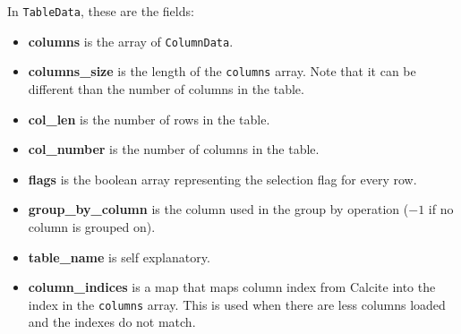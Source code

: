 \documentclass[a4paper, 10pt]{article}
\begin{document}
In \texttt{TableData}, these are the fields:
\begin{itemize}
    \item \textbf{columns} is the array of \texttt{ColumnData}.
    \item \textbf{columns\_size} is the length of the \texttt{columns} array. Note that it can be different than the number of columns in the table.
    \item \textbf{col\_len} is the number of rows in the table.
    \item \textbf{col\_number} is the number of columns in the table.
    \item \textbf{flags} is the boolean array representing the selection flag for every row.
    \item \textbf{group\_by\_column} is the column used in the group by operation ($-1$ if no column is grouped on).
    \item \textbf{table\_name} is self explanatory.
    \item \textbf{column\_indices} is a map that maps column index from Calcite into the index in the \texttt{columns} array. This is used when there are less columns loaded and the indexes do not match.
\end{itemize}
\end{document}

